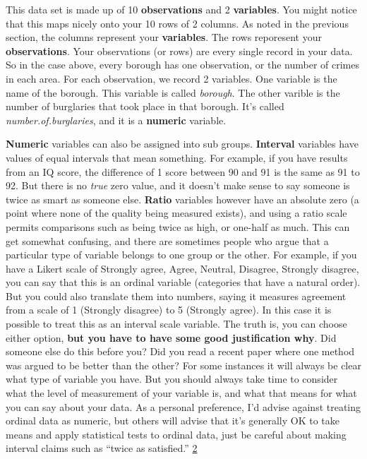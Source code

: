 \documentclass[]{book}
\theoremstyle{definition}
\theoremstyle{definition}
\theoremstyle{definition}
\theoremstyle{remark}
\begin{document}
This data set is made up of 10 \textbf{observations} and 2
\textbf{variables}. You might notice that this maps nicely onto your 10
rows of 2 columns. As noted in the previous section, the columns
represent your \textbf{variables}. The rows reporesent your
\textbf{observations}. Your observations (or rows) are every single
record in your data. So in the case above, every borough has one
observation, or the number of crimes in each area. For each observation,
we record 2 variables. One variable is the name of the borough. This
variable is called \emph{borough}. The other varible is the number of
burglaries that took place in that borough. It's called
\emph{number.of.burglaries}, and it is a \textbf{numeric} variable.

\textbf{Numeric} variables can also be assigned into sub groups.
\textbf{Interval} variables have values of equal intervals that mean
something. For example, if you have results from an IQ score, the
difference of 1 score between 90 and 91 is the same as 91 to 92. But
there is no \emph{true} zero value, and it doesn't make sense to say
someone is twice as smart as someone else. \textbf{Ratio} variables
however have an absolute zero (a point where none of the quality being
measured exists), and using a ratio scale permits comparisons such as
being twice as high, or one-half as much. This can get somewhat
confusing, and there are sometimes people who argue that a particular
type of variable belongs to one group or the other. For example, if you
have a Likert scale of Strongly agree, Agree, Neutral, Disagree,
Strongly disagree, you can say that this is an ordinal variable
(categories that have a natural order). But you could also translate
them into numbers, saying it measures agreement from a scale of 1
(Strongly disagree) to 5 (Strongly agree). In this case it is possible
to treat this as an interval scale variable. The truth is, you can
choose either option, \textbf{but you have to have some good
justification why}. Did someone else do this before you? Did you read a
recent paper where one method was argued to be better than the other?
For some instances it will always be clear what type of variable you
have. But you should always take time to consider what the level of
measurement of your variable is, and what that means for what you can
say about your data. As a personal preference, I'd advise against
treating ordinal data as numeric, but others will advise that it's
generally OK to take means and apply statistical tests to ordinal data,
just be careful about making interval claims such as ``twice as
satisfied.'' \href{http://www.usablestats.com/lessons/noir}{2}
\end{document}
